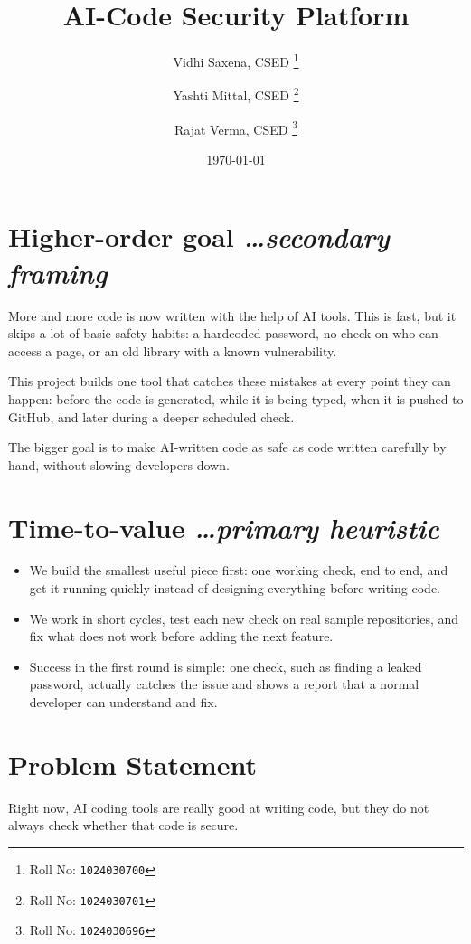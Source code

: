 \documentclass[11pt,a4paper]{article}
\title{AI-Code Security Platform}
\author{
  Vidhi Saxena, CSED%
  \thanks{Roll No: \texttt{1024030700}}
  \and
  Yashti Mittal, CSED%
  \thanks{Roll No: \texttt{1024030701}}
  \and
  Rajat Verma, CSED%
  \thanks{Roll No: \texttt{1024030696}}
}
\date{\today}
\newcommand{\BvrHint}[1]{%
  {\normalfont\normalsize\itshape\hfill #1}}
\begin{document}
\maketitle

\section{Higher-order goal
  \BvrHint{\ldots secondary framing}}

More and more code is now written with the help of AI tools. This is fast, but it skips a lot of basic safety habits: a hardcoded password, no check on who can access a page, or an old library with a known vulnerability.

This project builds one tool that catches these mistakes at every point they can happen: before the code is generated, while it is being typed, when it is pushed to GitHub, and later during a deeper scheduled check.

The bigger goal is to make AI-written code as safe as code written carefully by hand, without slowing developers down.

\section{Time-to-value
  \BvrHint{\ldots primary heuristic}}

\begin{itemize}[leftmargin=0.7cm]

    \item We build the smallest useful piece first: one working check, end to end, and get it running quickly instead of designing everything before writing code.

    \item We work in short cycles, test each new check on real sample repositories, and fix what does not work before adding the next feature.

    \item Success in the first round is simple: one check, such as finding a leaked password, actually catches the issue and shows a report that a normal developer can understand and fix.

\end{itemize}

\section{Problem Statement}

Right now, AI coding tools are really good at writing code, but they do not always check whether that code is secure.
\end{document}
